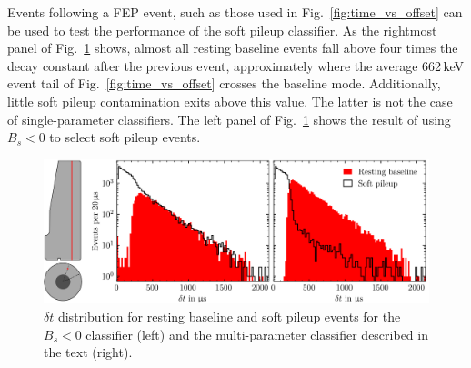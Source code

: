 Events following a FEP \CsS{} event, such as those used in Fig.~\ref{fig:time_vs_offset} can be used to test the performance of the soft pileup classifier. As the rightmost panel of Fig.~\ref{fig:soft_pileup_eval} shows, almost all resting baseline events fall above four times the decay constant after the previous event, approximately where the average 662\,keV event tail of Fig.~\ref{fig:time_vs_offset} crosses the baseline mode. Additionally, little soft pileup contamination exits above this value. The latter is not the case of single-parameter classifiers. The left panel of Fig.~\ref{fig:soft_pileup_eval} shows the result of using $B_s < 0$ to select soft pileup events.
\begin{figure}[htb]
    \centering
    \includegraphics[width=6in]{figs/param/dt_pileup_classifier.png}
    \caption{$\delta t$ distribution for resting baseline and soft pileup events for the $B_s < 0$ classifier (left) and the multi-parameter classifier described in the text (right).}
    \label{fig:soft_pileup_eval}
\end{figure}

